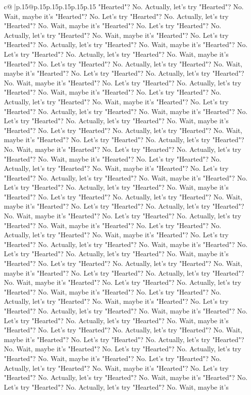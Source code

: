 \documentclass{article}
\begin{document}
{\begin{supertabular}{c@{$\;$}|p{.15\linewidth}@{}p{.15\linewidth}p{.15\linewidth}p{.15\linewidth}p{.15\linewidth}p{.15\linewidth}}
{{{"Hearted"? No. Actually, let's try "Hearted"? No. Wait, maybe it's "Hearted"? No. Let's try "Hearted"? No. Actually, let's try "Hearted"? No. Wait, maybe it's "Hearted"? No. Let's try "Hearted"? No. Actually, let's try "Hearted"? No. Wait, maybe it's "Hearted"? No. Let's try "Hearted"? No. Actually, let's try "Hearted"? No. Wait, maybe it's "Hearted"? No. Let's try "Hearted"? No. Actually, let's try "Hearted"? No. Wait, maybe it's "Hearted"? No. Let's try "Hearted"? No. Actually, let's try "Hearted"? No. Wait, maybe it's "Hearted"? No. Let's try "Hearted"? No. Actually, let's try "Hearted"? No. Wait, maybe it's "Hearted"? No. Let's try "Hearted"? No. Actually, let's try "Hearted"? No. Wait, maybe it's "Hearted"? No. Let's try "Hearted"? No. Actually, let's try "Hearted"? No. Wait, maybe it's "Hearted"? No. Let's try "Hearted"? No. Actually, let's try "Hearted"? No. Wait, maybe it's "Hearted"? No. Let's try "Hearted"? No. Actually, let's try "Hearted"? No. Wait, maybe it's "Hearted"? No. Let's try "Hearted"? No. Actually, let's try "Hearted"? No. Wait, maybe it's "Hearted"? No. Let's try "Hearted"? No. Actually, let's try "Hearted"? No. Wait, maybe it's "Hearted"? No. Let's try "Hearted"? No. Actually, let's try "Hearted"? No. Wait, maybe it's "Hearted"? No. Let's try "Hearted"? No. Actually, let's try "Hearted"? No. Wait, maybe it's "Hearted"? No. Let's try "Hearted"? No. Actually, let's try "Hearted"? No. Wait, maybe it's "Hearted"? No. Let's try "Hearted"? No. Actually, let's try "Hearted"? No. Wait, maybe it's "Hearted"? No. Let's try "Hearted"? No. Actually, let's try "Hearted"? No. Wait, maybe it's "Hearted"? No. Let's try "Hearted"? No. Actually, let's try "Hearted"? No. Wait, maybe it's "Hearted"? No. Let's try "Hearted"? No. Actually, let's try "Hearted"? No. Wait, maybe it's "Hearted"? No. Let's try "Hearted"? No. Actually, let's try "Hearted"? No. Wait, maybe it's "Hearted"? No. Let's try "Hearted"? No. Actually, let's try "Hearted"? No. Wait, maybe it's "Hearted"? No. Let's try "Hearted"? No. Actually, let's try "Hearted"? No. Wait, maybe it's "Hearted"? No. Let's try "Hearted"? No. Actually, let's try "Hearted"? No. Wait, maybe it's "Hearted"? No. Let's try "Hearted"? No. Actually, let's try "Hearted"? No. Wait, maybe it's "Hearted"? No. Let's try "Hearted"? No. Actually, let's try "Hearted"? No. Wait, maybe it's "Hearted"? No. Let's try "Hearted"? No. Actually, let's try "Hearted"? No. Wait, maybe it's "Hearted"? No. Let's try "Hearted"? No. Actually, let's try "Hearted"? No. Wait, maybe it's "Hearted"? No. Let's try "Hearted"? No. Actually, let's try "Hearted"? No. Wait, maybe it's "Hearted"? No. Let's try "Hearted"? No. Actually, let's try "Hearted"? No. Wait, maybe it's "Hearted"? No. Let's try "Hearted"? No. Actually, let's try "Hearted"? No. Wait, maybe it's "Hearted"? No. Let's try "Hearted"? No. Actually, let's try "Hearted"? No. Wait, maybe it's "Hearted"? No. Let's try "Hearted"? No. Actually, let's try "Hearted"? No. Wait, maybe it's "Hearted"? No. Let's try "Hearted"? No. Actually, let's try "Hearted"? No. Wait, maybe it's "Hearted"? No. Let's try "Hearted"? No. Actually, let's try "Hearted"? No. Wait, maybe it's }}}
\end{supertabular}}
\end{document}
